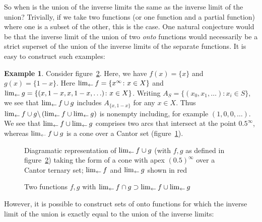 \documentclass{article}
\theoremstyle{definition}
\newtheorem{exam}[thm]{Example}
\begin{document}
So when is the union of the inverse limits the same as the inverse
limit of the union?  Trivially, if we take two functions (or one
function and a partial function) where one is a subset of the other,
this is the case.  One natural conjecture would be that the inverse
limit of the union of two {\em onto} functions would necessarily be a
strict superset of the union of the inverse limits of the separate
functions.  It is easy to construct such examples:

\begin{exam}
Consider figure~\ref{strictsuperset}.  Here, we have $f(x)=\lbrace
x\rbrace$ and $g(x)=\lbrace 1-x\rbrace$.  Here $\lim_{\leftarrow} f=\lbrace
x^\infty\colon x\in X\rbrace$ and $\lim_{\leftarrow} g = \lbrace (x, 1-x, x,
1-x, \ldots)\colon x\in X\rbrace$.  Writing
$A_S=\lbrace(x_0,x_1,\ldots)\colon x_i\in S\rbrace$, we see that
$\lim_{\leftarrow} f\cup g$ includes $A_{\lbrace x,1-x\rbrace}$ for any $x\in
X$. Thus $\lim_{\leftarrow} f\cup
  g\backslash\left(\lim_{\leftarrow} f\cup\lim_{\leftarrow} g\right)$ is nonempty
including, for example $(1,0,0,\ldots)$.  We see that
$\lim_{\leftarrow} f\cup\lim_{\leftarrow} g$ comprises two arcs that intersect at the
point $0.5^\infty$, whereas $\lim_{\leftarrow} f \cup g$ is a cone over a
Cantor set (figure~\ref{cantorfan}).
\end{exam}

\begin{figure}[h]
\caption{Diagramatic representation of\label{cantorfan} $\lim_{\leftarrow} f\cup
    g$ (with $f,g$ as defined in figure~\ref{strictsuperset}) taking
  the form of a cone with apex $(0.5)^\infty$ over a Cantor ternary
  set; $\lim_{\leftarrow} f$ and $\lim_{\leftarrow} g$ shown in red}
\end{figure}

\begin{figure}[h]
\caption{Two \label{strictsuperset} functions $f,g$ with
  $\lim_{\leftarrow} f\cap g\supset\lim_{\leftarrow} f\cup\lim_{\leftarrow} g$}
\end{figure}

However, it is possible to construct sets of onto functions for which
the inverse limit of the union is exactly equal to the union of the
inverse limits:
\end{document}
